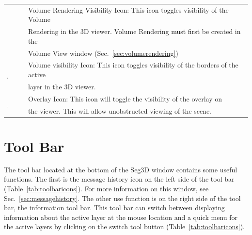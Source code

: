 \documentclass[fleqn,11pt,openany]{book}
\begin{document}
\begin{table}[h!]
\begin{tabular}{|l|l|}
& Volume Rendering Visibility Icon: This icon toggles visibility of the Volume\\
& Rendering in the 3D viewer.  Volume Rendering must first be created in the\\
& Volume View window (Sec.~\ref{sec:volumerendering})\\
\hline
\multirow{2}{*}{ \includegraphics[width=0.05\textwidth]{Seg3DBasicFunctionality_figures/VolumeVisibleOff.png} }
& Volume visibility Icon: This icon toggles visibility of the borders of the active\\ 
& layer in the 3D viewer.\\
\hline
\multirow{2}{*}{ \includegraphics[width=0.05\textwidth]{Seg3DBasicFunctionality_figures/OverlayOff.png} }
&  Overlay Icon: This icon will toggle the visibility of the overlay on \\
& the viewer.  This will allow unobstructed viewing of the scene.\\
\hline
\end{tabular}
\end{table}


\clearpage
\section{Tool Bar}

The tool bar located at the bottom of the Seg3D window contains some useful functions.
The first is the message history icon on the left side of the tool bar (Table~\ref{tab:toolbaricons}).
For more information on this window, see Sec.~\ref{sec:messagehistory}.
The other use function is on the right side of the tool bar, the information tool bar.
This tool bar can switch between displaying information about the active layer at the mouse location and a quick menu for the active layers by clicking on the switch tool button (Table~\ref{tab:toolbaricons}).  
\end{document}
